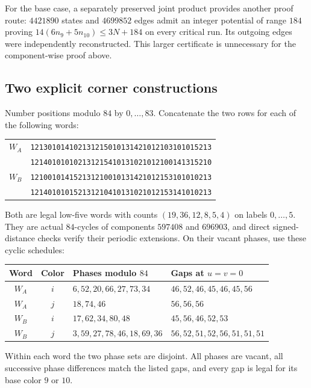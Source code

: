 \documentclass[11pt,reqno]{amsart}
\theoremstyle{plain}
\theoremstyle{plain}
\theoremstyle{plain}
\begin{document}
For the base case, a separately preserved joint product provides another
proof route: $4421890$ states and $4699852$ edges admit an integer
potential of range $184$ proving
$14(6n_9+5n_{10})\le3N+184$ on every critical run. Its outgoing edges
were independently reconstructed. This larger certificate is unnecessary
for the component-wise proof above.

\subsection{Two explicit corner constructions}

Number positions modulo $84$ by $0,\ldots,83$. Concatenate the two rows
for each of the following words:
\begin{center}\small
\begin{tabular}{cl}
$W_A$ & \texttt{121301014102131215010131421012103101015213}\\
      & \texttt{121401010102131215410131021012100141315210}\\[2pt]
$W_B$ & \texttt{121001014152131210010131421012153101010213}\\
      & \texttt{121401010152131210410131021012153141010213}\\
\end{tabular}
\end{center}
Both are legal low-five words with counts $(19,36,12,8,5,4)$ on
labels $0,\ldots,5$. They are actual $84$-cycles of components $597408$
and $696903$, and direct signed-distance checks verify their periodic
extensions. On their vacant phases, use these cyclic schedules:
\begin{center}\small
\begin{tabular}{ccll}
\toprule
Word & Color & Phases modulo $84$ & Gaps at $u=v=0$\\
\midrule
$W_A$ & $i$ & $6,52,20,66,27,73,34$ & $46,52,46,45,46,45,56$\\
$W_A$ & $j$ & $18,74,46$ & $56,56,56$\\
$W_B$ & $i$ & $17,62,34,80,48$ & $45,56,46,52,53$\\
$W_B$ & $j$ & $3,59,27,78,46,18,69,36$ & $56,52,51,52,56,51,51,51$\\
\bottomrule
\end{tabular}
\end{center}
Within each word the two phase sets are disjoint. All phases are vacant,
all successive phase differences match the listed gaps, and every gap
is legal for its base color $9$ or $10$.
\end{document}
